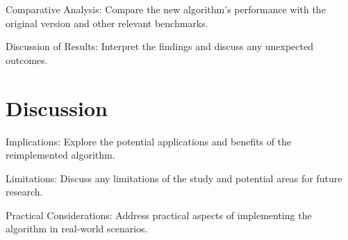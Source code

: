\documentclass[9pt]{pnas-new}
\begin{document}
Comparative Analysis: Compare the new algorithm's performance with the original version and other relevant benchmarks.

Discussion of Results: Interpret the findings and discuss any unexpected outcomes.

\section*{Discussion}
Implications: Explore the potential applications and benefits of the reimplemented algorithm.

Limitations: Discuss any limitations of the study and potential areas for future research.

Practical Considerations: Address practical aspects of implementing the algorithm in real-world scenarios.

\showacknow %


\begin{multicols}{2}
\section*{\bibname}

\end{multicols}
\end{document}
